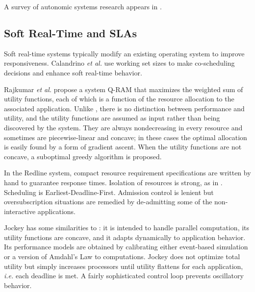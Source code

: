 A survey of autonomic systems research appears in \cite{1380585}.

\subsection*{Soft Real-Time and SLAs}
Soft real-time systems typically modify an existing operating system to improve responsiveness.
Calandrino \emph{et al.}\cite{unc} use working set sizes to make co-scheduling decisions and enhance soft real-time behavior.

%
Rajkumar \emph{et al.}\cite{828990} propose a system Q-RAM that maximizes the weighted sum of utility functions,
each of which is a function of the resource allocation to the associated application.
Unlike \pacora, there is no distinction between performance and utility, and
the utility functions are assumed as input rather than being discovered by the system.
They are always nondecreasing in every resource and sometimes are piecewise-linear and concave;
in these cases the optimal allocation is easily found by a form of gradient ascent.
When the utility functions are not concave, a suboptimal greedy algorithm is proposed.

%
In the Redline system\cite{Redline}, compact resource requirement specifications are written by hand to guarantee response times.
Isolation of resources is strong, as in \pacora.  Scheduling is Earliest-Deadline-First.
Admission control is lenient but oversubscription situations are remedied by de-admitting some of the non-interactive applications.

%
Jockey\cite{Jockey} has some similarities to \pacora: it is intended to handle parallel computation, its utility functions are concave,
and it adapts dynamically to application behavior.
Its performance models are obtained by calibrating either event-based simulation or a version of Amdahl's Law to computations.
Jockey does not optimize total utility but simply increases processors until utility flattens for each application,
\emph{i.e.} each deadline is met.
A fairly sophisticated control loop prevents oscillatory behavior.

